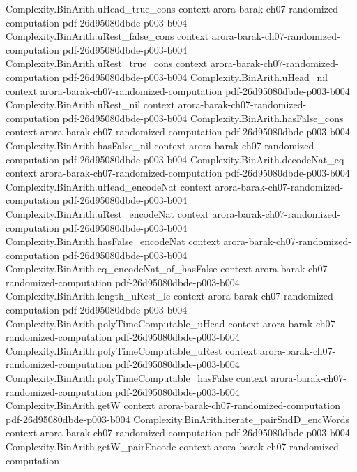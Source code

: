 \begin{theorem}
  {Complexity.BinArith.uHead_true_cons}
  {context}
  {arora-barak-ch07-randomized-computation}
  {pdf-26d95080dbde-p003-b004}
\proofstep
  {Complexity.BinArith.uRest_false_cons}
  {context}
  {arora-barak-ch07-randomized-computation}
  {pdf-26d95080dbde-p003-b004}
\proofstep
  {Complexity.BinArith.uRest_true_cons}
  {context}
  {arora-barak-ch07-randomized-computation}
  {pdf-26d95080dbde-p003-b004}
\proofstep
  {Complexity.BinArith.uHead_nil}
  {context}
  {arora-barak-ch07-randomized-computation}
  {pdf-26d95080dbde-p003-b004}
\proofstep
  {Complexity.BinArith.uRest_nil}
  {context}
  {arora-barak-ch07-randomized-computation}
  {pdf-26d95080dbde-p003-b004}
\proofstep
  {Complexity.BinArith.hasFalse_cons}
  {context}
  {arora-barak-ch07-randomized-computation}
  {pdf-26d95080dbde-p003-b004}
\proofstep
  {Complexity.BinArith.hasFalse_nil}
  {context}
  {arora-barak-ch07-randomized-computation}
  {pdf-26d95080dbde-p003-b004}
\proofstep
  {Complexity.BinArith.decodeNat_eq}
  {context}
  {arora-barak-ch07-randomized-computation}
  {pdf-26d95080dbde-p003-b004}
\proofstep
  {Complexity.BinArith.uHead_encodeNat}
  {context}
  {arora-barak-ch07-randomized-computation}
  {pdf-26d95080dbde-p003-b004}
\proofstep
  {Complexity.BinArith.uRest_encodeNat}
  {context}
  {arora-barak-ch07-randomized-computation}
  {pdf-26d95080dbde-p003-b004}
\proofstep
  {Complexity.BinArith.hasFalse_encodeNat}
  {context}
  {arora-barak-ch07-randomized-computation}
  {pdf-26d95080dbde-p003-b004}
\proofstep
  {Complexity.BinArith.eq_encodeNat_of_hasFalse}
  {context}
  {arora-barak-ch07-randomized-computation}
  {pdf-26d95080dbde-p003-b004}
\proofstep
  {Complexity.BinArith.length_uRest_le}
  {context}
  {arora-barak-ch07-randomized-computation}
  {pdf-26d95080dbde-p003-b004}
\proofstep
  {Complexity.BinArith.polyTimeComputable_uHead}
  {context}
  {arora-barak-ch07-randomized-computation}
  {pdf-26d95080dbde-p003-b004}
\proofstep
  {Complexity.BinArith.polyTimeComputable_uRest}
  {context}
  {arora-barak-ch07-randomized-computation}
  {pdf-26d95080dbde-p003-b004}
\proofstep
  {Complexity.BinArith.polyTimeComputable_hasFalse}
  {context}
  {arora-barak-ch07-randomized-computation}
  {pdf-26d95080dbde-p003-b004}
\proofstep
  {Complexity.BinArith.getW}
  {context}
  {arora-barak-ch07-randomized-computation}
  {pdf-26d95080dbde-p003-b004}
\proofstep
  {Complexity.BinArith.iterate_pairSndD_encWords}
  {context}
  {arora-barak-ch07-randomized-computation}
  {pdf-26d95080dbde-p003-b004}
\proofstep
  {Complexity.BinArith.getW_pairEncode}
  {context}
  {arora-barak-ch07-randomized-computation}

\end{theorem}
